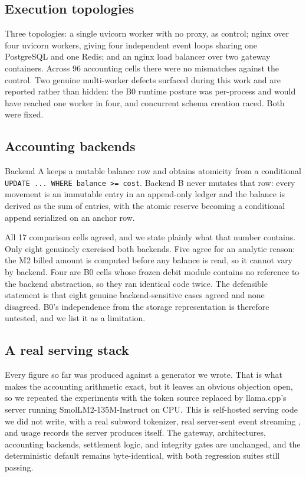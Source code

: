 \documentclass[preprint,3p,authoryear,12pt]{elsarticle}
\begin{document}
\subsection{Execution topologies}
Three topologies: a single uvicorn worker with no proxy, as control; nginx over four
uvicorn workers, giving four independent event loops sharing one PostgreSQL and one
Redis; and an nginx load balancer over two gateway containers. Across 96 accounting
cells there were no mismatches against the control. Two genuine multi-worker defects
surfaced during this work and are reported rather than hidden: the B0 runtime posture was
per-process and would have reached one worker in four, and concurrent schema creation
raced. Both were fixed.

\subsection{Accounting backends}
Backend A keeps a mutable balance row and obtains atomicity from a conditional
\texttt{UPDATE ... WHERE balance >= cost}. Backend B never mutates that row: every
movement is an immutable entry in an append-only ledger and the balance is derived as the
sum of entries, with the atomic reserve becoming a conditional append serialized on an
anchor row.

All 17 comparison cells agreed, and we state plainly what that number contains. Only
eight genuinely exercised both backends. Five agree for an analytic reason: the M2
billed amount is computed before any balance is read, so it cannot vary by backend.
Four are B0 cells whose frozen debit module contains no reference to the backend
abstraction, so they ran identical code twice. The defensible statement is that eight
genuine backend-sensitive cases agreed and none disagreed. B0's independence from the
storage representation is therefore untested, and we list it as a limitation.

\subsection{A real serving stack}
\label{sec:realstack}
Every figure so far was produced against a generator we wrote. That is what makes the
accounting arithmetic exact, but it leaves an obvious objection open, so we repeated the
experiments with the token source replaced by llama.cpp's server \citep{llamacpp} running
SmolLM2-135M-Instruct \citep{smollm2} on CPU. This is self-hosted serving code we did not
write, with a real subword tokenizer, real server-sent event streaming \citep{sse}, and
usage records the server produces itself. The gateway, architectures, accounting
backends, settlement logic, and integrity gates are unchanged, and the deterministic
default remains byte-identical, with both regression suites still passing.
\end{document}
